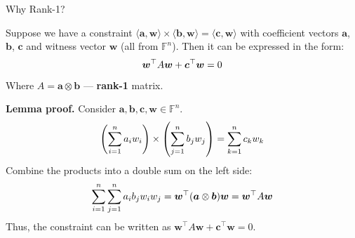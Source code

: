 \documentclass{zkdl-presentation-template}
\begin{document}
    \begin{frame}{Why Rank-1?}
        \begin{lemma}
            Suppose we have a constraint $\langle \boldsymbol{a}, \boldsymbol{w}\rangle \times \langle \boldsymbol{b}, \boldsymbol{w}\rangle = \langle \boldsymbol{c}, \boldsymbol{w} \rangle$ 
            with coefficient vectors $\boldsymbol{a}$, $\boldsymbol{b}$, $\boldsymbol{c}$ and witness vector 
            $\boldsymbol{w}$ (all from $\mathbb{F}^n$). Then it can be expressed in the form:
            \vspace{-5pt}
            \begin{equation*}
                 \boldsymbol{w}^{\top} A \boldsymbol{w} + \boldsymbol{c}^{\top} \boldsymbol{w} = 0
                 \vspace{-5pt}
            \end{equation*}
            Where $A = \boldsymbol{a} \otimes \boldsymbol{b}$ --- \textbf{rank-1} matrix.
        \end{lemma}
        \vspace{-10pt}
        
        \textbf{Lemma proof.} Consider $\boldsymbol{a}, \boldsymbol{b}, \boldsymbol{c}, \boldsymbol{w} \in \mathbb{F}^n$.
        \vspace{-5pt}
        \begin{equation*}
            \left(\sum_{i=1}^{n} a_i w_i\right) \times \left(\sum_{j=1}^{n} b_j w_j\right) = \sum_{k=1}^{n} c_k w_k
            \vspace{-5pt}
        \end{equation*}
        Combine the products into a double sum on the left side:
        \vspace{-5pt}
        \begin{equation*}
            \sum_{i=1}^{n} \sum_{j=1}^{n} a_i b_j w_i w_j = \boldsymbol{w}^{\top} (\boldsymbol{a} \otimes \boldsymbol{b}) \boldsymbol{w} = \boldsymbol{w}^{\top} A \boldsymbol{w}
            \vspace{-5pt}
        \end{equation*}
        Thus, the constraint can be written as $\boldsymbol{w}^{\top} A \boldsymbol{w} + \boldsymbol{c}^{\top} \boldsymbol{w} = 0$.
    \end{frame}
\end{document}
